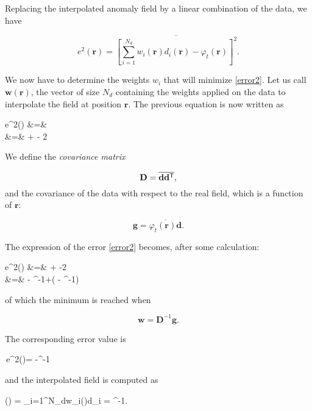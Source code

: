 Replacing the interpolated anomaly field by a linear combination of the data, we have 

\begin{equation}
e^{2}(\mathbf{r}) = \overline{\left[\sum_{i=1}^{N_{d}}w_{i}(\mathbf{r})d_{i}(\mathbf{r})-\varphi_{t}(\mathbf{r})\right]^{2}}.
\label{error2}
\end{equation}

We now have to determine the weights $w_{i}$ that will minimize \eqref{error2}. Let us call $\mathbf{w}(\mathbf{r})$, the vector of size $N_{d}$ containing the weights applied on the data to interpolate the field at position $\mathbf{r}$. The previous equation is now written as 


\beqn
e^{2}() &=&  \\
									&=&  +  - 2 
\eeqn

We define the \textit{covariance matrix}

\[
\mathbf{D} = \overline{\mathbf{d} {\mathbf{d}}^\mathsf{T}},
\]
and the covariance of the data with respect to the real field, which is a function of $\mathbf{r}$:

\[
\mathbf{g} = \overline{\varphi_{t}(\mathbf{r})\mathbf{d}}.
\]

The expression of the error \eqref{error2} becomes, after some calculation:

\beq
e^{2}() 
&=&  + -2 \nonumber\\
&=&  - ^{-1}+( - ^{-1})
\eeq

of which the minimum is reached when

\[
\mathbf{w}=\mathbf{D}^{-1}\mathbf{g}.
\]

The corresponding error value is 

\be
\min\,e^{2}()= -^{-1}
\label{eq:theory_error}
\ee

and the interpolated field is computed as

\be
\varphi() = \sum_{i=1}^{N_{d}}w_{i}()d_{i} = ^{-1}.
\label{eq:theory_field}
\ee


